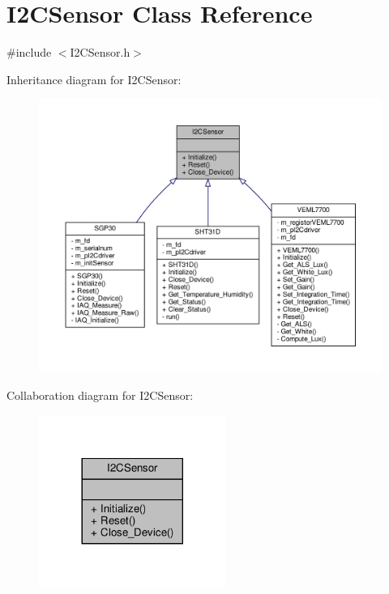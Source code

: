 \hypertarget{classI2CSensor}{}\section{I2\+C\+Sensor Class Reference}
\label{classI2CSensor}


{\ttfamily \#include $<$I2\+C\+Sensor.\+h$>$}



Inheritance diagram for I2\+C\+Sensor\+:\nopagebreak
\begin{figure}[H]
\begin{center}
\leavevmode
\includegraphics[width=350pt]{classI2CSensor__inherit__graph}
\end{center}
\end{figure}


Collaboration diagram for I2\+C\+Sensor\+:\nopagebreak
\begin{figure}[H]
\begin{center}
\leavevmode
\includegraphics[width=173pt]{classI2CSensor__coll__graph}
\end{center}
\end{figure}
